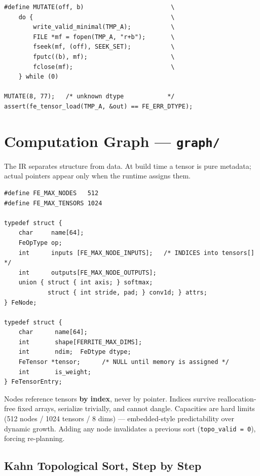 \documentclass[11pt,a4paper]{article}
\begin{document}
\begin{lstlisting}[style=cstyle,caption={tests/test\_tensor\_ser.c --- one-byte mutations, one assertion each}]
#define MUTATE(off, b)                        \
    do {                                      \
        write_valid_minimal(TMP_A);           \
        FILE *mf = fopen(TMP_A, "r+b");       \
        fseek(mf, (off), SEEK_SET);           \
        fputc((b), mf);                       \
        fclose(mf);                           \
    } while (0)

MUTATE(8, 77);   /* unknown dtype            */
assert(fe_tensor_load(TMP_A, &out) == FE_ERR_DTYPE);
\end{lstlisting}

\section{Computation Graph --- \texttt{graph/}}

The IR separates structure from data. At build time a tensor is pure metadata;
actual pointers appear only when the runtime assigns them.

\begin{lstlisting}[style=cstyle,caption={graph/graph.h --- fixed-capacity IR}]
#define FE_MAX_NODES   512
#define FE_MAX_TENSORS 1024

typedef struct {
    char     name[64];
    FeOpType op;
    int      inputs [FE_MAX_NODE_INPUTS];   /* INDICES into tensors[] */
    int      outputs[FE_MAX_NODE_OUTPUTS];
    union { struct { int axis; } softmax;
            struct { int stride, pad; } conv1d; } attrs;
} FeNode;

typedef struct {
    char      name[64];
    int       shape[FERRITE_MAX_DIMS];
    int       ndim;  FeDtype dtype;
    FeTensor *tensor;      /* NULL until memory is assigned */
    int       is_weight;
} FeTensorEntry;
\end{lstlisting}

Nodes reference tensors \textbf{by index}, never by pointer. Indices survive
reallocation-free fixed arrays, serialize trivially, and cannot dangle.
Capacities are hard limits (512 nodes / 1024 tensors / 8 dims) --- embedded-style
predictability over dynamic growth. Adding any node invalidates a previous sort
(\texttt{topo\_valid = 0}), forcing re-planning.

\subsection{Kahn Topological Sort, Step by Step}
\end{document}
